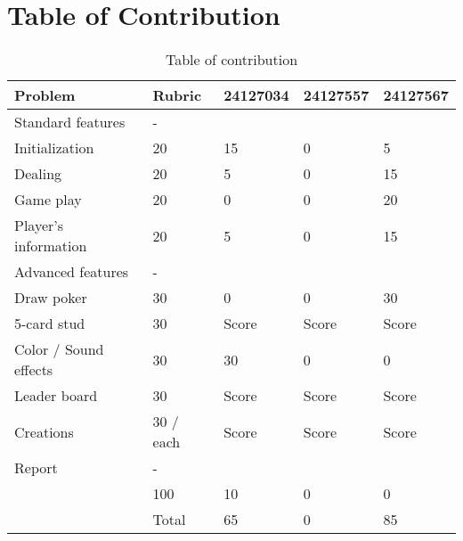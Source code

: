 \section{Table of Contribution}
\label{sec:contribution-table}

\renewcommand{\arraystretch}{1.5} %
\begin{table}[ht]
    \centering
    \begin{tabular}{|m{4cm}|m{2cm}|m{2cm}|m{2cm}| m{2cm}|}
    \hline
    \textbf{Problem} & \textbf{Rubric} & \textbf{24127034} & \textbf{24127557} & \textbf{24127567} \\
    \hline
    Standard features & - &  &  &  \\
    \hline
    Initialization & 20 & 15 & 0 & 5 \\
    \hline
    Dealing & 20 & 5 & 0 & 15 \\
    \hline 
    Game play & 20 & 0 & 0 & 20 \\
    \hline
    Player's information & 20 & 5 & 0 & 15 \\
    \hline
    Advanced features & - &  &  &  \\
    \hline 
    Draw poker & 30 & 0 & 0 & 30 \\
    \hline
    5-card stud & 30 & Score & Score & Score \\
    \hline
    Color / Sound effects & 30 & 30 & 0 & 0 \\
    \hline
    Leader board & 30 & Score & Score & Score \\
    \hline
    Creations & 30 / each & Score & Score & Score \\
    \hline
    Report & - &  &  &  \\
    \hline
     & 100 & 10 & 0 & 0 \\
    \hline
    & Total & 65 & 0 & 85 \\
    \hline
    \end{tabular}
    \caption{Table of contribution}
    \label{tab:contribution-table}

\end{table}